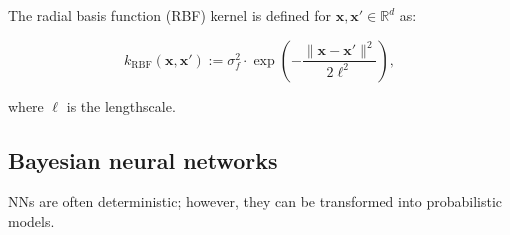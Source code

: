 The radial basis function (RBF) kernel is defined for
$\mathbf{x}, \mathbf{x}' \in \mathbb{R}^d$ as:

$$
k_{\text{RBF}}(\mathbf{x}, \mathbf{x}') := \sigma_f^2 \cdot \exp\left(-\frac{\|\mathbf{x} - \mathbf{x}'\|^2}{2\ell^2}\right),
$$

where $\ell$ is the lengthscale.


\subsection{Bayesian neural networks}

NNs are often deterministic; however, they can be transformed into probabilistic models.

